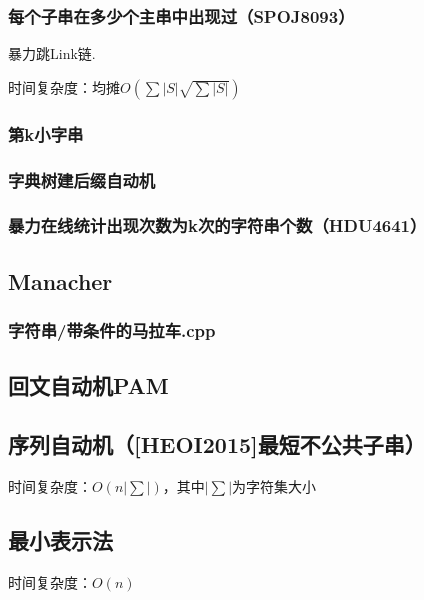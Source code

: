 \documentclass[landscape,twocolumn,twoside,a4paper]{article}
\begin{document}
\subsubsection{每个子串在多少个主串中出现过（SPOJ8093）}
暴力跳Link链.\par
时间复杂度：$均摊O(\sum |S|\sqrt{\sum |S|})$


\subsubsection{第k小字串}


\subsubsection{字典树建后缀自动机}


\subsubsection{暴力在线统计出现次数为k次的字符串个数（HDU4641）}



\subsection{Manacher}
\subsubsection{字符串/带条件的马拉车.cpp}

\subsection{回文自动机PAM}



\subsection{序列自动机（[HEOI2015]最短不公共子串）}
时间复杂度：$O(n|\sum|)$，其中$|\sum|$为字符集大小


\subsection{最小表示法}
时间复杂度：$O(n)$

\end{document}
